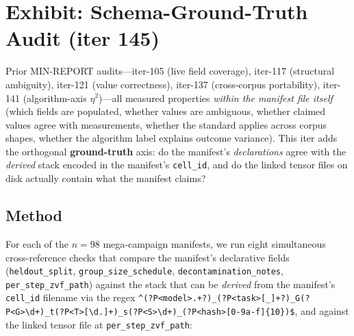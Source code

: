 \section{Exhibit: Schema-Ground-Truth Audit (iter 145)}
\label{sec:p5-schema-groundtruth}

Prior MIN-REPORT audits---iter-105 (live field coverage), iter-117
(structural ambiguity), iter-121 (value correctness), iter-137 (cross-corpus
portability), iter-141 (algorithm-axis $\eta^2$)---all measured properties
\emph{within the manifest file itself} (which fields are populated, whether
values are ambiguous, whether claimed values agree with measurements, whether
the standard applies across corpus shapes, whether the algorithm label
explains outcome variance). This iter adds the orthogonal
\textbf{ground-truth} axis: do the manifest's \emph{declarations} agree with
the \emph{derived} stack encoded in the manifest's \texttt{cell\_id}, and do
the linked tensor files on disk actually contain what the manifest claims?

\subsection*{Method}

For each of the $n = 98$ mega-campaign manifests, we run eight simultaneous
cross-reference checks that compare the manifest's declarative fields
(\texttt{heldout\_split}, \texttt{group\_size\_schedule},
\texttt{decontamination\_notes}, \texttt{per\_step\_zvf\_path}) against the
stack that can be \emph{derived} from the manifest's \texttt{cell\_id}
filename via the regex
\texttt{\^{}(?P<model>.+?)\_(?P<task>[\_]+?)\_G(?P<G>\textbackslash d+)\_t(?P<T>[\textbackslash d.]+)\_s(?P<S>\textbackslash d+)\_(?P<hash>[0-9a-f]\{10\})\$},
and against the linked tensor file at \texttt{per\_step\_zvf\_path}:

